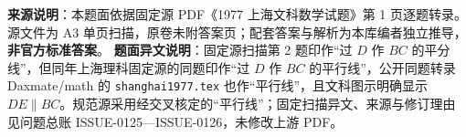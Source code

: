 

\begin{gktip}
\textbf{来源说明}：本题面依据固定源 PDF《1977 上海文科数学试题》第 1 页逐题转录。源文件为 A3 单页扫描，原卷未附答案页；配套答案与解析为本库编者独立推导，\textbf{非官方标准答案}。
\textbf{题面异文说明}：固定源扫描第 2 题印作“过 $D$ 作 $BC$ 的平分线”，但同年上海理科固定源的同题印作“过 $D$ 作 $BC$ 的平行线”，公开同题转录 Daxmate/math 的 \texttt{shanghai1977.tex} 也作“平行线”，且文科图示明确显示 $DE\parallel BC$。规范源采用经交叉核定的“平行线”；固定扫描异文、来源与修订理由见问题总账 ISSUE-0125—ISSUE-0126，未修改上游 PDF。
\end{gktip}

\par\medskip

